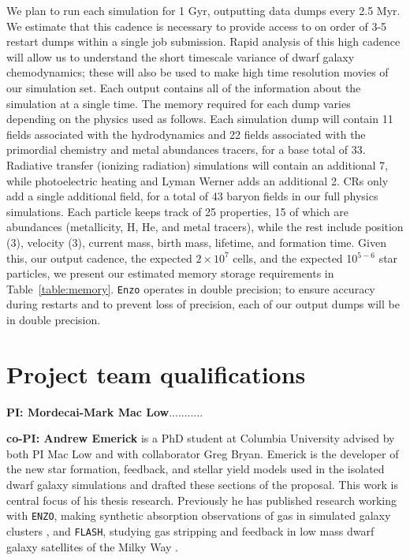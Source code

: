 \documentclass[11pt]{article}
\begin{document}
We plan to run each simulation for 1 Gyr, outputting data dumps every 2.5 Myr. We estimate that this cadence is necessary to provide access to on order of 3-5 restart dumps within a single job submission. Rapid analysis of this high cadence will allow us to understand the short timescale variance of dwarf galaxy chemodynamics; these will also be used to make high time resolution movies of our simulation set. Each output contains all of the information about the simulation at a single time. The memory required for each dump varies depending on the physics used as follows. Each simulation dump will contain 11 fields associated with the hydrodynamics and 22 fields associated with the primordial chemistry and metal abundances tracers, for a base total of 33. Radiative transfer (ionizing radiation) simulations will contain an additional 7, while photoelectric heating and Lyman Werner adds an additional 2. CRs only add a single additional field, for a total of 43 baryon fields in our full physics simulations. Each particle keeps track of 25 properties, 15 of which are abundances (metallicity, H, He, and metal tracers), while the rest include position (3), velocity (3), current mass, birth mass, lifetime, and formation time. Given this, our output cadence, the expected $2 \times 10^{7}$ cells, and the expected 10$^{5-6}$ star particles, we present our estimated memory storage requirements in Table~\ref{table:memory}. \texttt{Enzo} operates in double precision; to ensure accuracy during restarts and to prevent loss of precision, each of our output dumps will be in double precision.

\section{Project team qualifications}

\textbf{PI: Mordecai-Mark Mac Low}...........

\textbf{co-PI: Andrew Emerick} is a PhD student at Columbia University advised by both PI Mac Low and with collaborator Greg Bryan. Emerick is the developer of the new star formation, feedback, and stellar yield models used in the isolated dwarf galaxy simulations and drafted these sections of the proposal. This work is central focus of his thesis research. Previously he has published research working with \texttt{ENZO}, making synthetic absorption observations of gas in simulated galaxy clusters \citep{Emerick2015}, and \texttt{FLASH}, studying gas stripping and feedback in low mass dwarf galaxy satellites of the Milky Way \citep{Emerick2016}.
\end{document}
